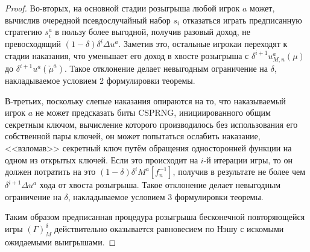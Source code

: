 \begin{proof}
	Во-вторых, на основной стадии розыгрыша любой игрок $a$ может, вычислив очередной псевдослучайный набор $s_i$ отказаться играть предписанную стратегию $s_i^a$ в пользу более выгодной, получив разовый доход, не превосходящий $(1 - \delta) \delta^i \Delta u^a$. Заметив это, остальные игрокаи переходят к стадии наказания, что уменьшает его доход в хвосте розыгрыша с $\delta^{i+1} u_{M,n}^a(\mu)$ до $\delta^{i+1} u^a(\check{\mu}^a)$. Такое отклонение делает невыгодным ограничение на $\delta$, накладываемое условием 2 формулировки теоремы.
	
	В-третьих, поскольку слепые наказания опираются на то, что наказываемый игрок $a$ не может предсказать биты CSPRNG, инициированного общим секретным ключом, вычисление которого производилось без использования его собственной пары ключей, он может попытаться ослабить наказание, <<взломав>> секретный ключ путём обращения односторонней функции на одном из открытых ключей. Если это происходит на $i$-й итерации игры, то он должен потратить на это $(1 - \delta) \delta^i M^a[f_n^{-1}]$, получив в результате не более чем $\delta^{i+1} \Delta u^a$ хода от хвоста розыгрыша. Такое отклонение делает невыгодным ограничение на $\delta$, накладываемое условием 3 формулировки теоремы.
	
	Таким образом предписанная процедура розыгрыша бесконечной повторяющейся игры $(\Gamma)_M^{\delta}$ действительно оказывается равновесием по Нэшу с искомыми ожидаемыми выигрышами. %
\end{proof}

